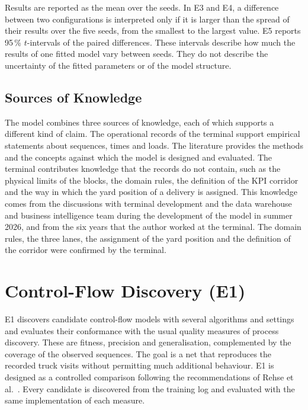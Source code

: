 Results are reported as the mean over the seeds. In E3 and E4, a difference between
two configurations is interpreted only if it is larger than the spread of their
results over the five seeds, from the smallest to the largest value. E5 reports
95\,\% $t$-intervals of the paired differences. These intervals describe how much
the results of one fitted model vary between seeds. They do not describe the
uncertainty of the fitted parameters or of the model structure.

\subsection{Sources of Knowledge}
\label{sec:exp_review}

The model combines three sources of knowledge, each of which supports a different
kind of claim. The operational records of the terminal support empirical
statements about sequences, times and loads. The literature provides the methods
and the concepts against which the model is designed and evaluated. The terminal
contributes knowledge that the records do not contain, such as the physical limits
of the blocks, the domain rules, the definition of the KPI corridor and the way in
which the yard position of a delivery is assigned. This knowledge comes from the
discussions with terminal development and the data warehouse and business
intelligence team during the development of the model in summer 2026, and from the
six years that the author worked at the terminal. The domain rules, the three lanes,
the assignment of the yard position and the definition of the corridor were confirmed
by the terminal. 

\section{Control-Flow Discovery (E1)}
\label{sec:exp_discovery}

E1 discovers candidate control-flow models with several algorithms and settings
and evaluates their conformance with the usual quality measures of process
discovery. These are fitness, precision and generalisation, complemented by the
coverage of the observed sequences. The goal is a net that reproduces the recorded
truck visits without permitting much additional behaviour. E1 is designed as a
controlled comparison following the recommendations of Rehse et
al.~\cite{RWRehse2024Experimentation}. Every candidate is discovered from the
training log and evaluated with the same implementation of each measure.

